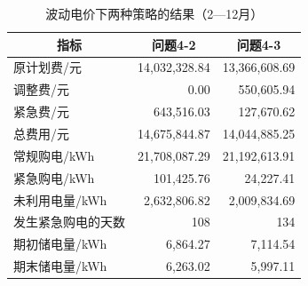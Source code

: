 \par
\begin{table}[!htbp]
\centering
\caption{波动电价下两种策略的结果（2—12月）}\label{tab:q4-comparison}
\normalsize
\begin{tabular}{lrr}
\toprule
\multicolumn{1}{c}{指标} & \multicolumn{1}{c}{问题4-2} & \multicolumn{1}{c}{问题4-3} \\
\midrule
原计划费/元 & 14,032,328.84 & 13,366,608.69 \\
调整费/元 & 0.00 & 550,605.94 \\
紧急费/元 & 643,516.03 & 127,670.62 \\
总费用/元 & 14,675,844.87 & 14,044,885.25 \\
常规购电/kWh & 21,708,087.29 & 21,192,613.91 \\
紧急购电/kWh & 101,425.76 & 24,227.41 \\
未利用电量/kWh & 2,632,806.82 & 2,009,834.69 \\
发生紧急购电的天数 & 108 & 134 \\
期初储电量/kWh & 6,864.27 & 7,114.54 \\
期末储电量/kWh & 6,263.02 & 5,997.11 \\
\bottomrule
\end{tabular}
\end{table}
\par
